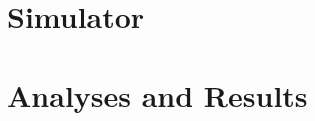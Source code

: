 \documentclass[11pt,twocolumn,letterpaper]{article}
\begin{document}
	\section{Simulator}
	\label{sec:simulator}
	
	\section{Analyses and Results}
	\label{sec:analyses}
	
	\printbibliography
\end{document}
